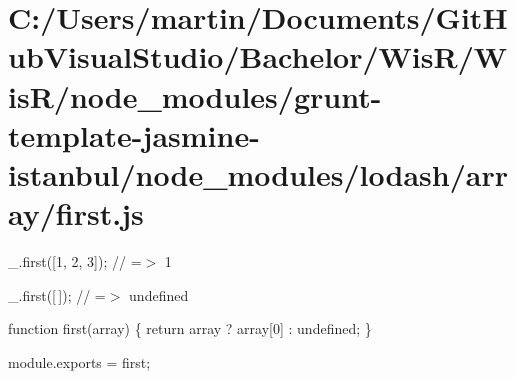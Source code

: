 \hypertarget{_c_1_2_users_2martin_2_documents_2_git_hub_visual_studio_2_bachelor_2_wis_r_2_wis_r_2node_module208c141f9cf432bad701e3188a5e6410}{}\section{C\+:/\+Users/martin/\+Documents/\+Git\+Hub\+Visual\+Studio/\+Bachelor/\+Wis\+R/\+Wis\+R/node\+\_\+modules/grunt-\/template-\/jasmine-\/istanbul/node\+\_\+modules/lodash/array/first.\+js}
\+\_\+.\+first(\mbox{[}1, 2, 3\mbox{]}); // =$>$ 1

\+\_\+.\+first(\mbox{[}$\,$\mbox{]}); // =$>$ undefined


\begin{DoxyCodeInclude}

\textcolor{keyword}{function} first(array) \{
  \textcolor{keywordflow}{return} array ? array[0] : undefined;
\}

module.exports = first;
\end{DoxyCodeInclude}
 